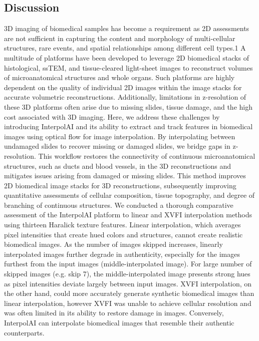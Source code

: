 \begin{refsection}
    \section{Discussion}
    3D imaging of biomedical samples has become a requirement as 2D assessments are not sufficient in capturing the content and morphology of multi-cellular structures, rare events, and spatial relationships among different cell types.1 A multitude of platforms have been developed to leverage 2D biomedical stacks of histological, ssTEM, and tissue-cleared light-sheet images to reconstruct volumes of microanatomical structures and whole organs. Such platforms are highly dependent on the quality of individual 2D images within the image stacks for accurate volumetric reconstructions. Additionally, limitations in z-resolution of these 3D platforms often arise due to missing slides, tissue damage, and the high cost associated with 3D imaging. 
    Here, we address these challenges by introducing InterpolAI and its ability to extract and track features in biomedical images using optical flow for image interpolation. By interpolating between undamaged slides to recover missing or damaged slides, we bridge gaps in z-resolution. This workflow restores the connectivity of continuous microanatomical structures, such as ducts and blood vessels, in the 3D reconstructions and mitigates issues arising from damaged or missing slides. This method improves 2D biomedical image stacks for 3D reconstructions, subsequently improving quantitative assessments of cellular composition, tissue topography, and degree of branching of continuous structures.
    We conducted a thorough comparative assessment of the InterpolAI platform to linear and XVFI interpolation methods using thirteen Haralick texture features. Linear interpolation, which averages pixel intensities that create hued colors and structures, cannot create realistic biomedical images. As the number of images skipped increases, linearly interpolated images further degrade in authenticity, especially for the images furthest from the input images (middle-interpolated image). For large number of skipped images (e.g. skip 7), the middle-interpolated image presents strong hues as pixel intensities deviate largely between input images. XVFI interpolation, on the other hand, could more accurately generate synthetic biomedical images than linear interpolation, however XVFI was unable to achieve cellular resolution and was often limited in its ability to restore damage in images. Conversely, InterpolAI can interpolate biomedical images that resemble their authentic counterparts. 

\end{refsection}
